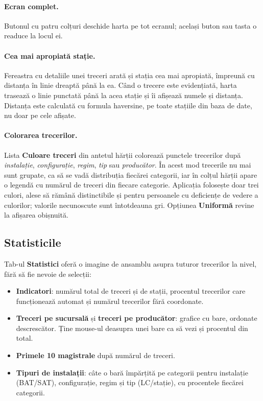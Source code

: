 \documentclass[11pt,a4paper]{article}
\newcommand{\ui}[1]{\textsf{\textbf{#1}}}
\newcommand{\kbd}[1]{\fbox{\footnotesize\texttt{#1}}}
\begin{document}
\paragraph{Ecran complet.} Butonul cu patru colțuri deschide harta pe tot
ecranul; același buton sau tasta \kbd{Esc} o readuce la locul ei.

\paragraph{Cea mai apropiată stație.} Fereastra cu detaliile unei treceri
arată și stația cea mai apropiată, împreună cu distanța în linie dreaptă
până la ea. Când o trecere este evidențiată, harta trasează o linie
punctată până la acea stație și îi afișează numele și distanța. Distanța
este calculată cu formula haversine, pe toate stațiile din baza de date,
nu doar pe cele afișate.

\paragraph{Colorarea trecerilor.} Lista \ui{Culoare treceri} din antetul
hărții colorează punctele trecerilor după \emph{instalație},
\emph{configurație}, \emph{regim}, \emph{tip} sau \emph{producător}. În acest
mod trecerile nu mai sunt grupate, ca să se vadă distribuția fiecărei
categorii, iar în colțul hărții apare o legendă cu numărul de treceri din
fiecare categorie. Aplicația folosește doar trei culori, alese să rămână
distinctibile și pentru persoanele cu deficiențe de vedere a culorilor;
valorile necunoscute sunt întotdeauna gri. Opțiunea \ui{Uniformă} revine la
afișarea obișnuită.

\subsection{Statisticile}

Tab-ul \ui{Statistici} oferă o imagine de ansamblu asupra tuturor trecerilor
la nivel, fără să fie nevoie de selecții:

\begin{itemize}
  \item \textbf{Indicatori}: numărul total de treceri și de stații, procentul
        trecerilor care funcționează automat și numărul trecerilor fără
        coordonate.
  \item \textbf{Treceri pe sucursală} și \textbf{treceri pe producător}:
        grafice cu bare, ordonate descrescător. Ține mouse-ul deasupra unei
        bare ca să vezi și procentul din total.
  \item \textbf{Primele 10 magistrale} după numărul de treceri.
  \item \textbf{Tipuri de instalații}: câte o bară împărțită pe categorii
        pentru instalație (BAT/SAT), configurație, regim și tip (LC/stație),
        cu procentele fiecărei categorii.
\end{itemize}
\end{document}
